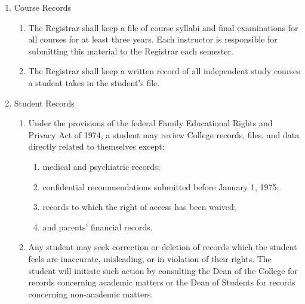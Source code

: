 \documentclass{manual}
\newcommand{\modified}[1]{}
\newcommand{\oldbreak}[1]{}
\newcommand{\editRemove}[1]{}
\newcommand{\itemLevelA}{\alph*.}
\newcommand{\itemLevelB}{\arabic*)}
\newcommand{\itemRefA}{\alph*}
\newcommand{\itemRefB}{\arabic*}
\begin{document}
\begin{enumerate}[label=\itemLevelA,ref=\itemRefA]
\item Course Records

\begin{enumerate}[label=\itemLevelB,ref=\itemRefB]

\item The Registrar shall keep a file of course syllabi \editRemove{and midyear (for hyphenated courses)} and final examinations for all courses for at least three years. Each instructor is responsible for submitting this material to the Registrar each semester.

\item The Registrar\modified{5/12/98}  shall keep a written record of all independent study courses a student takes in the student's file.

\end{enumerate}
\oldbreak{VII-7}

\item Student Records

\begin{enumerate}[label=\itemLevelB,ref=\itemRefB]

\item Under the provisions of the federal Family Educational Rights and Privacy Act of 1974, a student may review College records, files, and data directly related to themselves except: 

\begin{enumerate}[label=\alph*)]

\item medical and psychiatric records; 

\item confidential recommendations submitted before January 1, 1975;

\item records to which the right of access has been waived; 

\item and parents' financial records.
\end{enumerate}

\item Any student may seek correction or deletion of records which the student feels are inaccurate, misleading, or in violation of their rights. The student will initiate such action by consulting the Dean of the College for records concerning academic matters or the Dean of Students for records concerning non-academic matters.


\end{enumerate}
\end{enumerate}
\end{document}
